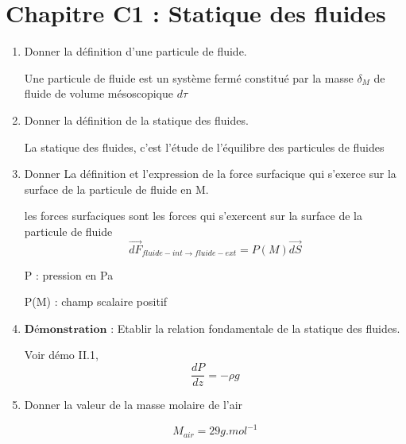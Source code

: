 \section*{\centering Chapitre C1 : Statique des fluides}
\begin{enumerate}[label=\arabic{enumi} - , left=0pt, itemsep=1em] %
    \item Donner la définition d'une particule de fluide. \par
    \begin{solution}
     Une particule de fluide est un système fermé constitué par la masse $\delta_M$ de fluide de volume mésoscopique $d\tau$
    \end{solution}

    \item Donner la définition de la statique des fluides. \par
    \begin{solution}
     La statique des fluides, c'est l'étude de l'équilibre des particules de fluides 
    \end{solution}

    \item Donner La définition et l'expression de la force surfacique qui s'exerce sur la surface de la particule de fluide en M. \par
    \begin{solution}
     les forces surfaciques sont les forces qui s'exercent sur la surface de la particule de fluide
          \[ \overrightarrow{dF}_{fluide-int \to fluide-ext} = P(M) \vec{dS}\]
         
               \tiny P : pression en Pa \par
               \tiny  P(M) : champ scalaire positif
     \end{solution}

     \item $\textbf{Démonstration :}$ Etablir la relation fondamentale de la statique des fluides.\par
           \begin{solution}
               Voir démo II.1, \[ \frac{dP}{dz}=-\rho g \]
       
           \end{solution}
     
     \item Donner la valeur de la masse molaire de l'air\par
           \begin{solution}
               \[ M_{air} = 29 g.mol^{-1} \]
       

\end{solution}
\end{enumerate}
